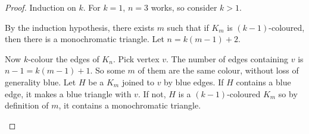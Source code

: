 \documentclass{article}
\begin{document}
\begin{proof}
    Induction on $k$. For $k=1$, $n=3$ works, so consider $k>1$.

    By the induction hypothesis, there exists $m$ such that if $K_m$ is $(k-1)$-coloured, then there is a monochromatic triangle.  Let $n = k(m-1) + 2$.

    Now $k$-colour the edges of $K_n$.  Pick vertex $v$.
    The number of edges containing $v$ is $n-1 = k(m-1)+1$.  So some $m$ of them are the same colour, without loss of generality blue.
    Let $H$ be a $K_m$ joined to $v$ by blue edges. If $H$ contains a blue edge, it makes a blue triangle with $v$.
    If not, $H$ is a $(k-1)$-coloured $K_m$ so by definition of $m$, it contains a monochromatic triangle.
    \begin{center}
    \end{center}
\end{proof}
\end{document}
